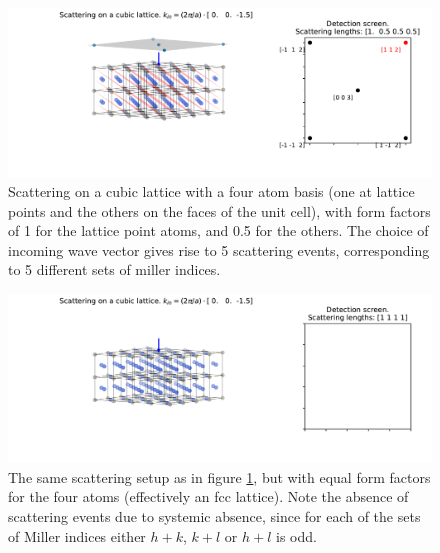 \documentclass[main.tex]{subfiles}
\begin{document}
	
	\begin{figure}
		\centering
		\includegraphics[width=\linewidth]{figures/scattering_no_systemic.pdf}
		\caption{Scattering on a cubic lattice with a four atom basis (one at lattice points and the others on the faces of the unit cell), with form factors of 1 for the lattice point atoms, and 0.5 for the others. The choice of incoming wave vector gives rise to 5 scattering events, corresponding to 5 different sets of miller indices.}
		\label{fig:scattering_no_systemic}
	\end{figure}

	\begin{figure}
		\centering
		\includegraphics[width=\linewidth]{figures/scattering_systemic.pdf}
		\caption{The same scattering setup as in figure \ref{fig:scattering_no_systemic}, but with equal form factors for the four atoms (effectively an fcc lattice). Note the absence of scattering events due to systemic absence, since for each of the sets of Miller indices either $ h+k $, $ k+l $ or $ h+l $ is odd.}
		\label{fig:scattering_systemic}
	\end{figure}

	
\end{document}
